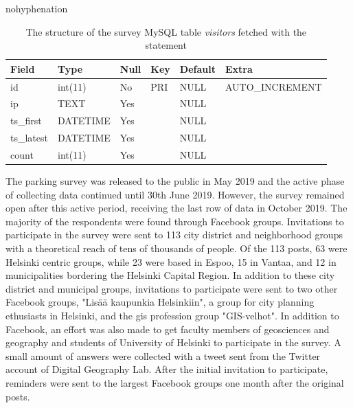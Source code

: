 \begin{hyphenrules}{nohyphenation}
    \begin{table}[H]
        \centering
        \setlength\tabcolsep{1.2ex}
        \caption[Structure of MySQL table visitors]{The structure of the survey MySQL table \textit{visitors} fetched with the statement } 
        \label{tab:mysql_visitors_str}
        \begin{tabular}{ @{} >{\raggedright\arraybackslash}p{2cm} >{\raggedright\arraybackslash}p{2cm} >{\raggedright\arraybackslash}p{1cm} >{\raggedright\arraybackslash}p{1cm} >{\raggedright\arraybackslash}p{1.5cm} >{\raggedleft\arraybackslash}p{4cm} @{} }
            \toprule
            Field & Type & Null & Key & Default & Extra \\
            \midrule
            id & int(11) & No & PRI & NULL & AUTO\_INCREMENT \\
            ip & TEXT & Yes & & NULL & \\
            ts\_first & DATETIME & Yes & & NULL & \\
            ts\_latest & DATETIME & Yes & & NULL & \\
            count & int(11) & Yes & & NULL & \\        
            \bottomrule
        \end{tabular}
    \end{table} 
\end{hyphenrules}

The parking survey was released to the public in May 2019 and the active phase of collecting data continued until 30th June 2019. However, the survey remained open after this active period, receiving the last row of data in October 2019. The majority of the respondents were found through Facebook groups. Invitations to participate in the survey were sent to 113 city district and neighborhood groups with a theoretical reach of tens of thousands of people. Of the 113 posts, 63 were Helsinki centric groups, while 23 were based in Espoo, 15 in Vantaa, and 12 in municipalities bordering the Helsinki Capital Region. In addition to these city district and municipal groups, invitations to participate were sent to two other Facebook groups, "Lisää kaupunkia Helsinkiin", a group for city planning ethusiasts in Helsinki, and the \acrshort{gis} profession group "GIS-velhot". In addition to Facebook, an effort was also made to get faculty members of geosciences and geography and students of University of Helsinki to participate in the survey. A small amount of answers were collected with a tweet sent from the Twitter account of Digital Geography Lab. After the initial invitation to participate, reminders were sent to the largest Facebook groups one month after the original posts.

